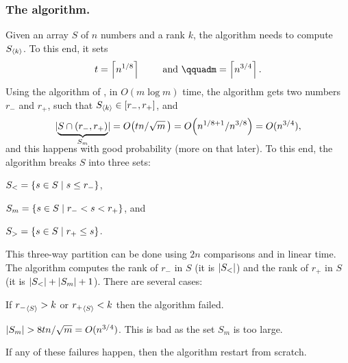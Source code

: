\subsubsection{The algorithm.}
Given an array $S$ of $n$ numbers and a rank $k$, the algorithm needs to
compute $S_{\langle k\rangle}$. To this end, it sets
\begin{equation*}
    t= \ceil{n^{1/8}}
    \qquad\text{ and }\qquad%
    m = \ceil{n^{3/4}}.
\end{equation*}
Using the algorithm of , in $O( m \log m)$ time,
the algorithm gets two numbers $r_{-}$ and $r_+$, such that
$S_{\langle k\rangle} \in [r_{-}, r_{+}]$, and
\begin{equation*}
    \cardin{ \smash{\underbrace{S \cap (r_{-}, r_{+})}_{S_m}} }%
    =%
    O\bigl(tn /\sqrt{m}\,\bigr)%
    =%
    O\pth{ n^{1/8+ 1}  / n^{3/8}}%
    =%
    O(n^{3/4}),
\end{equation*} %
and this happens with good probability (more on that later).
To this end, the algorithm breaks $S$ into three sets:
\begin{compactenumi}
    \smallskip%
    \item $S_< = \left\{  s \in S \;\middle\vert\; s \leq r_{-} \right\}$,
    \smallskip%
    \item $S_m = \left\{  s \in S \;\middle\vert\; r_{-} < s < r_{+} \right\}$, and
    \smallskip%
    \item $S_> = \left\{  s \in S \;\middle\vert\;  r_{+} \leq s \right\}$.
\end{compactenumi}%
\medskip%
This three-way partition can be done using $2n$ comparisons and in linear
time.  The algorithm computes the rank of $r_-$ in $S$ (it is
$\left| {S_<} \right|$) and the rank of $r_{+}$ in $S$ (it is
$\left| {S_<} \right| + \left| {S_m} \right| + 1$). There are several cases: \smallskip%
\begin{compactitem}
    \item If ${r_{-}}_{ \left\langle { S} \right\rangle} > k$ or ${r_{+}}_{ \left\langle {S} \right\rangle} < k $ then the
    algorithm failed.

    \item $\left| {S_m} \right| > 8 t {n}/ \sqrt{m} = O( n^{3 / 4})$. This is bad
    as the set $S_m$ is too large.
\end{compactitem}
\medskip%
If any of these failures happen, then the algorithm restart from scratch.
